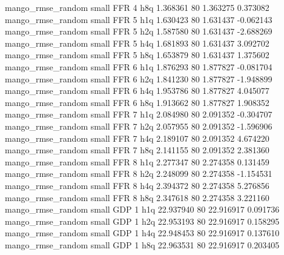 mango_rmse_random      small      FFR                 4                  h8q  1.368361 80       1.363275           0.373082
mango_rmse_random      small      FFR                 5                  h1q  1.630423 80       1.631437          -0.062143
mango_rmse_random      small      FFR                 5                  h2q  1.587580 80       1.631437          -2.688269
mango_rmse_random      small      FFR                 5                  h4q  1.681893 80       1.631437           3.092702
mango_rmse_random      small      FFR                 5                  h8q  1.653879 80       1.631437           1.375602
mango_rmse_random      small      FFR                 6                  h1q  1.876293 80       1.877827          -0.081704
mango_rmse_random      small      FFR                 6                  h2q  1.841230 80       1.877827          -1.948899
mango_rmse_random      small      FFR                 6                  h4q  1.953786 80       1.877827           4.045077
mango_rmse_random      small      FFR                 6                  h8q  1.913662 80       1.877827           1.908352
mango_rmse_random      small      FFR                 7                  h1q  2.084980 80       2.091352          -0.304707
mango_rmse_random      small      FFR                 7                  h2q  2.057955 80       2.091352          -1.596906
mango_rmse_random      small      FFR                 7                  h4q  2.189107 80       2.091352           4.674220
mango_rmse_random      small      FFR                 7                  h8q  2.141155 80       2.091352           2.381360
mango_rmse_random      small      FFR                 8                  h1q  2.277347 80       2.274358           0.131459
mango_rmse_random      small      FFR                 8                  h2q  2.248099 80       2.274358          -1.154531
mango_rmse_random      small      FFR                 8                  h4q  2.394372 80       2.274358           5.276856
mango_rmse_random      small      FFR                 8                  h8q  2.347618 80       2.274358           3.221160
mango_rmse_random      small      GDP                 1                  h1q 22.937940 80      22.916917           0.091736
mango_rmse_random      small      GDP                 1                  h2q 22.953193 80      22.916917           0.158295
mango_rmse_random      small      GDP                 1                  h4q 22.948453 80      22.916917           0.137610
mango_rmse_random      small      GDP                 1                  h8q 22.963531 80      22.916917           0.203405
